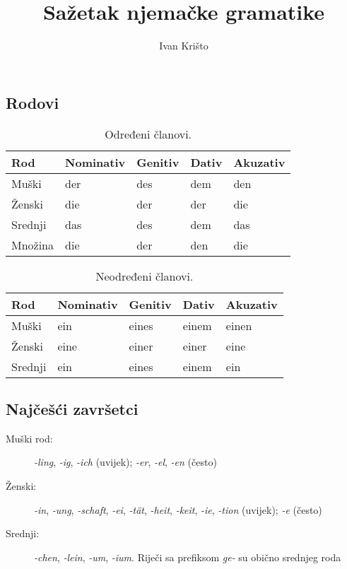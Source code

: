\documentclass[12pt,german]{article}
\author{Ivan Krišto}
\newcommand{\nastavak}[1]{\emph{-#1}}
\newcommand{\prefiks}[1]{\emph{#1-}}
\begin{document}
\title{Sažetak njemačke gramatike}
\date{}
\maketitle


\begin{multicols}{2}
\section{Rodovi}

\begin{table}[H]
\caption{Određeni članovi.}
\begin{tabular}{lllll}
\toprule
Rod & Nominativ & Genitiv & Dativ & Akuzativ \\
\midrule
Muški & der & des & dem & den \\
Ženski & die & der & der & die \\
Srednji & das & des & dem & das \\
Množina & die & der & den & die \\
\bottomrule
\end{tabular}
\end{table}

\begin{table}[H]
\caption{Neodređeni članovi.}
\begin{tabular}{lllll}
\toprule
Rod & Nominativ & Genitiv & Dativ & Akuzativ \\
\midrule
Muški & ein & eines & einem & einen \\
Ženski & eine & einer & einer & eine \\
Srednji & ein & eines & einem & ein \\
\bottomrule
\end{tabular}
\end{table}

\subsection{Najčešći završetci}
\begin{description}
  \item[Muški rod:]
    \nastavak{ling}, \nastavak{ig}, \nastavak{ich} (uvijek);
    \nastavak{er}, \nastavak{el}, \nastavak{en} (često)
  \item[Ženski:]
    \nastavak{in}, \nastavak{ung}, \nastavak{schaft}, \nastavak{ei},
    \nastavak{t\"at}, \nastavak{heit}, \nastavak{keit},
    \nastavak{ie}, \nastavak{tion} (uvijek);
    \nastavak{e} (često)
  \item[Srednji:]
    \nastavak{chen}, \nastavak{lein}, \nastavak{um}, \nastavak{ium}.
    Riječi sa prefiksom \prefiks{ge} su obično srednjeg roda
\end{description}


\end{multicols}
\end{document}
